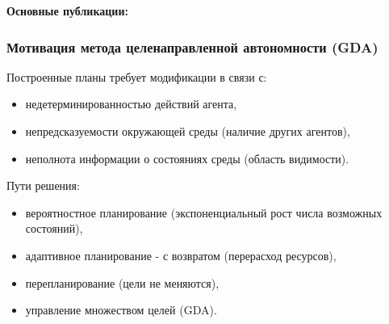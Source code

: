 \documentclass[default]{beamer}
\begin{document}
\begin{frame}
\begin{columns}
\begin{column}{0.2\textwidth}
\begin{figure}
				\end{figure}
			\end{column}
		\end{columns}
		\par\medskip
		\textbf{Основные публикации:}
		\nocite{*}
		\printbibliography
	\end{frame}

	\begin{frame}
		\frametitle{Мотивация метода целенаправленной автономности (GDA)}
		
		Построенные планы требует модификации в связи с:
		\begin{itemize}
			\item недетерминированностью действий агента,
			\item непредсказуемости окружающей среды (наличие других агентов),
			\item неполнота информации о состояниях среды (область видимости).
		\end{itemize}
	
		Пути решения:
		\begin{itemize}
			\item вероятностное планирование (экспоненциальный рост числа возможных состояний),
			\item адаптивное планирование - с возвратом (перерасход ресурсов),
			\item перепланирование (цели не меняются),
			\item управление множеством целей (GDA).
		\end{itemize}
	\end{frame}
\end{document}
